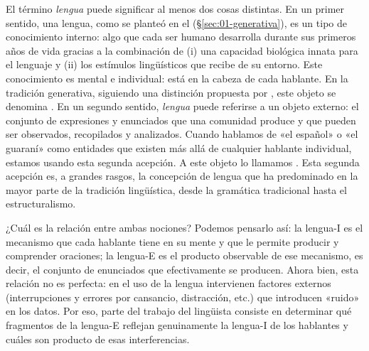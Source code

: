 El término \textit{lengua} puede significar al menos dos cosas distintas. En un
primer sentido, una lengua, como se planteó en el 
(§\ref{sec:01-generativa}), es un tipo de conocimiento interno: algo que cada ser
humano desarrolla durante sus primeros años de vida gracias a la combinación de
(i) una capacidad biológica innata para el lenguaje y (ii) los estímulos
lingüísticos que recibe de su entorno. Este conocimiento es mental e individual:
está en la cabeza de cada hablante. En la tradición generativa, siguiendo una
distinción propuesta por \textcite{chomsky1986}, este objeto se denomina
. En un segundo sentido, \textit{lengua} puede referirse a un
objeto externo: el conjunto de expresiones y enunciados que una comunidad
produce y que pueden ser observados, recopilados y analizados. Cuando hablamos de
«el español» o «el guaraní» como entidades que existen más allá de cualquier
hablante individual, estamos usando esta segunda acepción. A este objeto lo
llamamos . Esta segunda acepción es, a grandes rasgos, la
concepción de lengua que ha predominado en la mayor parte de la tradición
lingüística, desde la gramática tradicional hasta el estructuralismo.

¿Cuál es la relación entre ambas nociones? Podemos pensarlo así: la lengua-I es
el mecanismo que cada hablante tiene en su mente y que le permite producir y
comprender oraciones; la lengua-E es el producto observable de ese mecanismo, es
decir, el conjunto de enunciados que efectivamente se producen. Ahora bien, esta
relación no es perfecta: en el uso de la lengua intervienen factores externos
(interrupciones y errores por cansancio, distracción, etc.) que introducen
«ruido» en los datos. Por eso, parte del trabajo del lingüista consiste en
determinar qué fragmentos de la lengua-E reflejan genuinamente la lengua-I de los
hablantes y cuáles son producto de esas interferencias.

